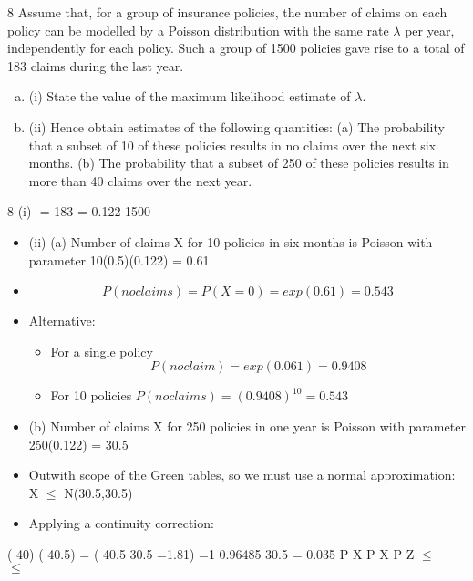 \documentclass[a4paper,12pt]{article}
\begin{document}
  8 Assume that, for a group of insurance policies, the number of claims on each policy
can be modelled by a Poisson distribution with the same rate $\lambda$ per year,
independently for each policy. Such a group of 1500 policies gave rise to a total of
183 claims during the last year.
\begin{enumerate}[(a)]
    \item (i) State the value of the maximum likelihood estimate of $\lambda$.
\item (ii) Hence obtain estimates of the following quantities:
(a) The probability that a subset of 10 of these policies results in no claims
over the next six months.
(b) The probability that a subset of 250 of these policies results in more
than 40 claims over the next year. 
\end{enumerate}


8 (i)  = 183 = 0.122
1500

\begin{itemize}
    \item (ii) (a) Number of claims X for 10 policies in six months is Poisson with parameter 10(0.5)(0.122) = 0.61
\item \[P(no claims) = P(X = 0) = exp(	0.61) = 0.543\]
\item Alternative:
\begin{itemize}
\item For a single policy \[P(no claim) = exp(	0.061) = 0.9408\]
\item For 10 policies 
$P(no claims) = (0.9408)^10 = 0.543$
\end{itemize}
\item (b) Number of claims X for 250 policies in one year is Poisson with parameter 250(0.122) = 30.5
\item Outwith scope of the Green tables, so we must use a normal
approximation:
X $\leq$ N(30.5,30.5)
\item Applying a continuity correction:
\end{itemize}

( 40) ( 40.5) = ( 40.5 30.5 =1.81) =1 0.96485
30.5
= 0.035
P X P X P Z $\leq$
    $\leq$
\end{document}
